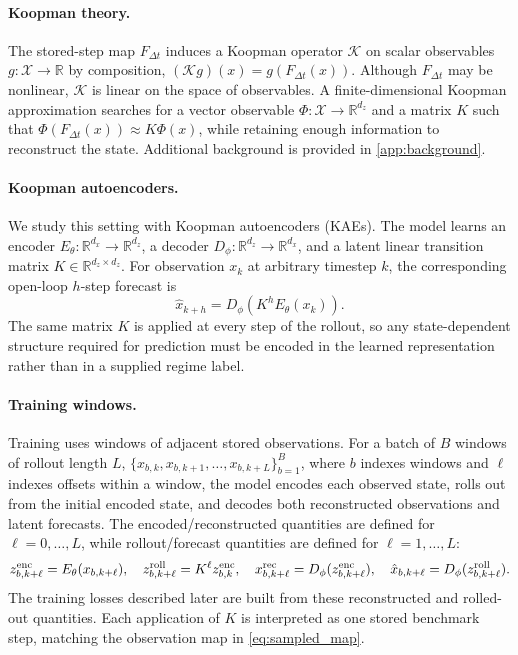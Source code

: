 \documentclass[11pt]{article}
\newcommand{\R}{\mathbb{R}}
\newcommand{\Enc}{E_\theta}
\newcommand{\Dec}{D_\phi}
\theoremstyle{plain}
\theoremstyle{definition}
\begin{document}
\paragraph{Koopman theory.} The stored-step map \(F_{\Delta t}\) induces a Koopman operator \(\mathcal K\) on scalar observables \(g:\mathcal X\to\R\) by composition, \((\mathcal K g)(x)=g(F_{\Delta t}(x))\). Although \(F_{\Delta t}\) may be nonlinear, \(\mathcal K\) is linear on the space of observables. A finite-dimensional Koopman approximation searches for a vector observable \(\Phi:\mathcal X\to\R^{d_z}\) and a matrix \(K\) such that \(\Phi(F_{\Delta t}(x))\approx K\Phi(x)\), while retaining enough information to reconstruct the state. Additional background is provided in \cref{app:background}.


\paragraph{Koopman autoencoders.} We study this setting with Koopman autoencoders (KAEs). The model learns an encoder $\Enc:\R^{d_x}\rightarrow\R^{d_z}$, a decoder $\Dec:\R^{d_z}\rightarrow\R^{d_x}$, and a latent linear transition matrix $K\in\R^{d_z\times d_z}$. For observation $x_k$ at arbitrary timestep $k$, the corresponding open-loop $h$-step forecast is
\begin{equation}
  \hat x_{k+h}=\Dec\!\left(K^h\Enc(x_k)\right).
  \label{eq:kae_forecast}
\end{equation}
The same matrix $K$ is applied at every step of the rollout, so any state-dependent structure required for prediction must be encoded in the learned representation rather than in a supplied regime label.

\paragraph{Training windows.} Training uses windows of adjacent stored observations. For a batch of $B$ windows of rollout length $L$,
$\{x_{b,k},x_{b,k+1},\ldots,x_{b,k+L}\}_{b=1}^{B}$, where $b$ indexes windows and $\ell$ indexes offsets within a window, the model encodes each observed state, rolls out from the initial encoded state, and decodes both reconstructed observations and latent forecasts. The encoded/reconstructed quantities are defined for $\ell=0,\ldots,L$, while rollout/forecast quantities are defined for $\ell=1,\ldots,L$:
\begin{equation}
\begin{aligned}
  z_{b,k+\ell}^{\rm enc} = \Enc(x_{b,k+\ell}),\quad
  z_{b,k+\ell}^{\rm roll}=K^\ell z_{b,k}^{\rm enc},\quad
  x_{b,k+\ell}^{\rm rec} = \Dec(z_{b,k+\ell}^{\rm enc}),\quad
  \hat x_{b,k+\ell}=\Dec(z_{b,k+\ell}^{\rm roll}).
\end{aligned}
\label{eq:window_rollout}
\end{equation}
The training losses described later are built from these reconstructed and rolled-out quantities. Each application of $K$ is interpreted as one stored benchmark step, matching the observation map in \cref{eq:sampled_map}.
\end{document}
